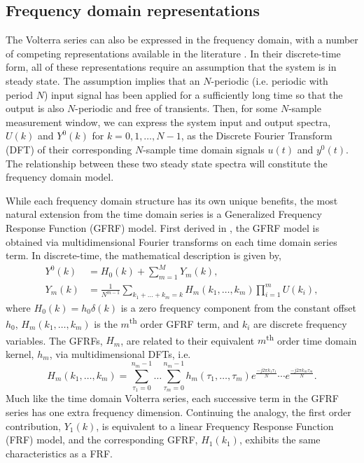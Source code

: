 \subsection{Frequency domain representations}

The Volterra series can also be expressed in the frequency domain, with a number of competing representations available in the literature \cite{Cheng2017}. In their discrete-time form, all of these representations require an assumption that the system is in steady state. The assumption implies that an $N$-periodic (i.e. periodic with period $N$) input signal has been applied for a sufficiently long time so that the output is also $N$-periodic and free of transients. Then, for some $N$-sample measurement window, we can express the system input and output spectra, $U(k)$ and $Y^0(k)$ for $k=0,1,\hdots,N-1$, as the Discrete Fourier Transform (DFT) of their corresponding $N$-sample time domain signals $u(t)$ and $y^0(t)$. The relationship between these two steady state spectra will constitute the frequency domain model.

While each frequency domain structure has its own unique benefits, the most natural extension from the time domain series is a Generalized Frequency Response Function (GFRF) model. First derived in \cite{George1959}, the GFRF model is obtained via multidimensional Fourier transforms on each time domain series term. In discrete-time, the mathematical description is given by,
\begin{equation}
\begin{split}
Y^0(k) &= H_0(k) + \sum_{m=1}^{M} Y_m(k),  \\
Y_m(k) &= \frac{1}{N^{m-1}} \sum_{k_1 + \hdots + k_m = k} H_m(k_1, \hdots,k_m) \prod_{i=1}^{m} U(k_i), 
\end{split}
\label{eqn:GFRFoutputeqn}
\end{equation}
where $H_0(k) = h_0 \delta(k)$ is a zero frequency component from the constant offset $h_0$, $H_m(k_1, \hdots,k_m)$ is the $m$\textsuperscript{th} order GFRF term, and $k_i$ are discrete frequency variables. The GFRFs, $H_m$, are related to their equivalent $m$\textsuperscript{th} order time domain kernel, $h_m$, via multidimensional DFTs, i.e.
\begin{equation}
\label{eqn:GFRF_Transform}
H_m(k_1, \hdots,k_m) = \sum_{\tau_1=0}^{n_m - 1} \hdots \sum_{\tau_m=0}^{n_m-1} h_m(\tau_1,\hdots,\tau_m) e^{\frac{-j2 \pi k_1 \tau_1}{N}} \cdots e^{\frac{-j2 \pi k_m \tau_m}{N}}.
\end{equation}
Much like the time domain Volterra series, each successive term in the GFRF series has one extra frequency dimension. Continuing the analogy, the first order contribution, $Y_1(k)$, is equivalent to a linear Frequency Response Function (FRF) model, and the corresponding GFRF, $H_1(k_1)$, exhibits the same characteristics as a FRF.

